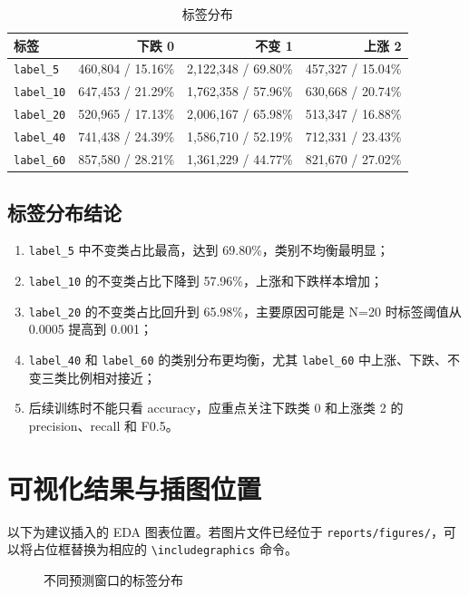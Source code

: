 \documentclass[UTF8,a4paper,12pt]{ctexart}
\begin{document}
\begin{table}[H]
\centering
\caption{标签分布}
\begin{tabular}{lrrr}
\toprule
标签 & 下跌 0 & 不变 1 & 上涨 2 \\
\midrule
\texttt{label\_5} & 460,804 / 15.16\% & 2,122,348 / 69.80\% & 457,327 / 15.04\% \\
\texttt{label\_10} & 647,453 / 21.29\% & 1,762,358 / 57.96\% & 630,668 / 20.74\% \\
\texttt{label\_20} & 520,965 / 17.13\% & 2,006,167 / 65.98\% & 513,347 / 16.88\% \\
\texttt{label\_40} & 741,438 / 24.39\% & 1,586,710 / 52.19\% & 712,331 / 23.43\% \\
\texttt{label\_60} & 857,580 / 28.21\% & 1,361,229 / 44.77\% & 821,670 / 27.02\% \\
\bottomrule
\end{tabular}
\end{table}

\subsection{标签分布结论}

\begin{enumerate}
    \item \texttt{label\_5} 中不变类占比最高，达到 69.80\%，类别不均衡最明显；
    \item \texttt{label\_10} 的不变类占比下降到 57.96\%，上涨和下跌样本增加；
    \item \texttt{label\_20} 的不变类占比回升到 65.98\%，主要原因可能是 N=20 时标签阈值从 0.0005 提高到 0.001；
    \item \texttt{label\_40} 和 \texttt{label\_60} 的类别分布更均衡，尤其 \texttt{label\_60} 中上涨、下跌、不变三类比例相对接近；
    \item 后续训练时不能只看 accuracy，应重点关注下跌类 0 和上涨类 2 的 precision、recall 和 F0.5。
\end{enumerate}

\section{可视化结果与插图位置}

以下为建议插入的 EDA 图表位置。若图片文件已经位于 \texttt{reports/figures/}，可以将占位框替换为相应的 \texttt{\textbackslash includegraphics} 命令。

\begin{figure}[H]
\centering
{}
\caption{不同预测窗口的标签分布}
\end{figure}
\end{document}
